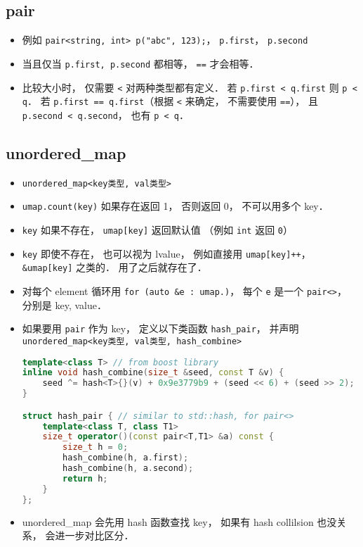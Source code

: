 
\begin{issues}
\issueDraft
\end{issues}

\subsection{pair}
\begin{itemize}
\item 例如 \verb|pair<string, int> p("abc", 123);|， \verb|p.first|， \verb|p.second|
\item 当且仅当 \verb|p.first, p.second| 都相等， \verb|==| 才会相等．
\item 比较大小时， 仅需要 \verb|<| 对两种类型都有定义． 若 \verb|p.first < q.first| 则 \verb|p < q|． 若 \verb|p.first == q.first|（根据 \verb|<| 来确定， 不需要使用 \verb|==|）， 且 \verb|p.second < q.second|， 也有 \verb|p < q|．
\end{itemize}

\subsection{unordered_map}
\begin{itemize}
\item \verb|unordered_map<key类型, val类型>|
\item \verb|umap.count(key)| 如果存在返回 1， 否则返回 0， 不可以用多个 key．
\item \verb|key| 如果不存在， \verb|umap[key]| 返回默认值 （例如 \verb|int| 返回 \verb|0|）
\item \verb|key| 即使不存在， 也可以视为 lvalue， 例如直接用 \verb|umap[key]++|， \verb|&umap[key]| 之类的． 用了之后就存在了．
\item 对每个 element 循环用 \verb|for (auto &e : umap.)|， 每个 \verb|e| 是一个 \verb|pair<>|， 分别是 key, value．
\item 如果要用 \verb|pair| 作为 key， 定义以下类函数 \verb|hash_pair|， 并声明 \verb|unordered_map<key类型, val类型, hash_combine>|
\begin{lstlisting}[language=cpp]
template<class T> // from boost library
inline void hash_combine(size_t &seed, const T &v) {
    seed ^= hash<T>{}(v) + 0x9e3779b9 + (seed << 6) + (seed >> 2);
}

struct hash_pair { // similar to std::hash, for pair<>
    template<class T, class T1>
    size_t operator()(const pair<T,T1> &a) const {
        size_t h = 0;
        hash_combine(h, a.first);
        hash_combine(h, a.second);
        return h;
    }
};
\end{lstlisting}
\item unordered_map 会先用 hash 函数查找 key， 如果有 hash collilsion 也没关系， 会进一步对比区分．
\end{itemize}

